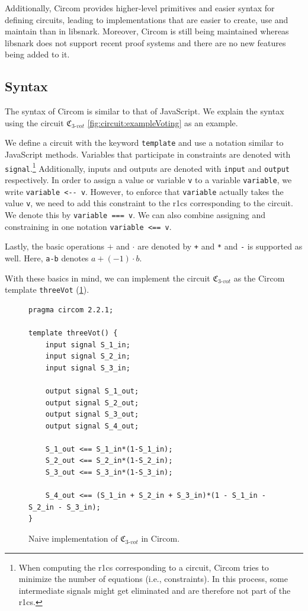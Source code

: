 Additionally, Circom provides higher-level primitives and easier syntax for defining circuits, leading to implementations that are easier to create, use and maintain than in libsnark.
Moreover, Circom is still being maintained whereas libsnark does not support recent proof systems and there are no new features being added to it.

\subsection{Syntax}
The syntax of Circom is similar to that of JavaScript.
We explain the syntax using the circuit $\mathfrak{C}_{3\text{-}vot}$ \cref{fig:circuit:exampleVoting} as an example.

We define a circuit with the keyword \verb|template| and use a notation similar to JavaScript methods.
Variables that participate in constraints are denoted with \verb|signal|.\footnote{
    \label{footnote:circomSignalElimination}
    When computing the \gls{r1cs} corresponding to a circuit, Circom tries to minimize the number of equations (i.e., constraints).
    In this process, some intermediate signals might get eliminated and are therefore not part of the \gls{r1cs}.
}
Additionally, inputs and outputs are denoted with \verb|input| and \verb|output| respectively.
In order to assign a value or variable \verb|v| to a variable \verb|variable|, we write \verb|variable <-- v|.
However, to enforce that \verb|variable| actually takes the value \verb|v|, we need to add this constraint to the \gls{r1cs} corresponding to the circuit.
We denote this by \verb|variable === v|. 
We can also combine assigning and constraining in one notation \verb|variable <== v|.

Lastly, the basic operations $+$ and $\cdot$ are denoted by \verb|+| and \verb|*| and \verb|-| is supported as well.
Here, \verb|a-b| denotes $a+(-1)\cdot b$.

With these basics in mind, we can implement the circuit $\mathfrak{C}_{3\text{-}vot}$ as the Circom template \verb|threeVot| (\cref{fig:circom:naiveThreeVot}).

\begin{figure}[h]
    \centering
    \captionsetup{type=listing}
    \begin{lstlisting}[language=Circom]
pragma circom 2.2.1;

template threeVot() {
    input signal S_1_in;
    input signal S_2_in;
    input signal S_3_in;

    output signal S_1_out;
    output signal S_2_out;
    output signal S_3_out;
    output signal S_4_out;

    S_1_out <== S_1_in*(1-S_1_in);
    S_2_out <== S_2_in*(1-S_2_in);
    S_3_out <== S_3_in*(1-S_3_in);

    S_4_out <== (S_1_in + S_2_in + S_3_in)*(1 - S_1_in - S_2_in - S_3_in);
}\end{lstlisting}
    \caption{Naive implementation of $\mathfrak{C}_{3\text{-}vot}$ in Circom.}
    \label{fig:circom:naiveThreeVot}
\end{figure}

